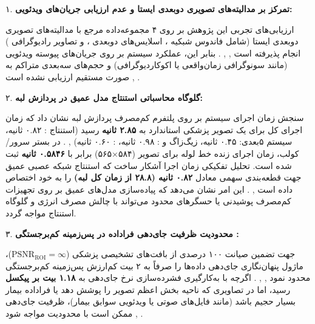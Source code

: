

۱. \textbf{تمرکز بر مدالیته‌های تصویری دوبعدی ایستا و عدم ارزیابی جریان‌های ویدئویی:}\par

ارزیابی‌های تجربی این پژوهش بر روی ۴ مجموعه‌داده مرجع با مدالیته‌های تصویری دوبعدی ایستا (شامل فاندوس شبکیه ، اسلایس‌های دوبعدی ، و تصاویر رادیوگرافی ) انجام پذیرفته است , , . بنابر این، عملکرد سیستم بر روی جریان‌های پیوسته ویدئویی (مانند سونوگرافی زمان‌واقعی یا اکوکاردیوگرافی) و حجم‌های سه‌بعدی متراکم  به صورت مستقیم ارزیابی نشده است , .\par



۲. \textbf{گلوگاه محاسباتی استنتاج مدل عمیق  در پردازش لبه:}\par

سنجش زمان اجرای سیستم بر روی پلتفرم کم‌مصرف پردازش لبه  نشان داد که زمان اجرای کل برای یک تصویر پزشکی استاندارد به \textbf{۲.۸۵ ثانیه} رسید (استنتاج : ۰.۸۲ ثانیه، سیستم ۵بعدی: ۰.۴۵ ثانیه، زیگ‌زاگ و : ۰.۹۸ ثانیه، : ۰.۶۰ ثانیه) , . در بستر سرور/کولب، زمان اجرای زنده خط لوله برای تصویر  (۵۸۴×۵۶۵) برابر با \textbf{۰.۵۸۴۶ ثانیه} ثبت شده است. تحلیل تفکیکی زمان اجرا آشکار ساخت که استنتاج شبکه عصبی عمیق  جهت قطعه‌بندی  سهمی معادل \textbf{۰.۸۲ ثانیه (۲۸.۸ از زمان کل لبه)} را به خود اختصاص داده است , . این امر نشان می‌دهد که پیاده‌سازی مدل‌های عمیق بر روی تجهیزات کم‌مصرف پوشیدنی یا حسگرهای محدود  می‌تواند با چالش مصرف انرژی و گلوگاه استنتاج مواجه گردد.\par



۳. \textbf{محدودیت ظرفیت جای‌دهی فراداده در پس‌زمینه کم‌برجستگی :}\par

جهت تضمین صیانت ۱۰۰ درصدی از بافت‌های تشخیصی پزشکی ($\mathrm{PSNR}_{\mathrm{ROI}} = \infty$)، ماژول پنهان‌نگاری  جای‌دهی داده‌ها را صرفاً به ۲ بیت کم‌ارزش  پس‌زمینه کم‌برجستگی محدود نمود , , . اگرچه با به‌کارگیری فشرده‌سازی  نرخ جای‌دهی به \textbf{۱.۱۸ بیت بر پیکسل } رسید، اما در تصاویری که ناحیه  بخش اعظم تصویر را پوشش دهد یا فراداده بیمار بسیار حجیم باشد (مانند فایل‌های صوتی یا ویدئویی سوابق بیمار)، ظرفیت جای‌دهی ممکن است با محدودیت مواجه شود , .\par


